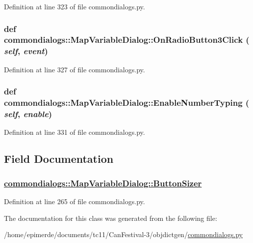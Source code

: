 Definition at line 323 of file commondialogs.py.\hypertarget{classcommondialogs_1_1MapVariableDialog_64b1004d131ad794053dd456431501ca}{
\subsubsection[OnRadioButton3Click]{\setlength{\rightskip}{0pt plus 5cm}def commondialogs::Map\-Variable\-Dialog::On\-Radio\-Button3Click ( {\em self},  {\em event})}}
\label{classcommondialogs_1_1MapVariableDialog_64b1004d131ad794053dd456431501ca}




Definition at line 327 of file commondialogs.py.\hypertarget{classcommondialogs_1_1MapVariableDialog_d971712aba98f0888bb5210073dd8737}{
\subsubsection[EnableNumberTyping]{\setlength{\rightskip}{0pt plus 5cm}def commondialogs::Map\-Variable\-Dialog::Enable\-Number\-Typing ( {\em self},  {\em enable})}}
\label{classcommondialogs_1_1MapVariableDialog_d971712aba98f0888bb5210073dd8737}




Definition at line 331 of file commondialogs.py.

\subsection{Field Documentation}
\hypertarget{classcommondialogs_1_1MapVariableDialog_142e2cd20328fd573126f5b60e8cec20}{
\subsubsection[ButtonSizer]{\setlength{\rightskip}{0pt plus 5cm}\hyperlink{classcommondialogs_1_1MapVariableDialog_142e2cd20328fd573126f5b60e8cec20}{commondialogs::Map\-Variable\-Dialog::Button\-Sizer}}}
\label{classcommondialogs_1_1MapVariableDialog_142e2cd20328fd573126f5b60e8cec20}




Definition at line 265 of file commondialogs.py.

The documentation for this class was generated from the following file:\begin{CompactItemize}
\item 
/home/epimerde/documents/tc11/Can\-Festival-3/objdictgen/\hyperlink{commondialogs_8py}{commondialogs.py}\end{CompactItemize}

